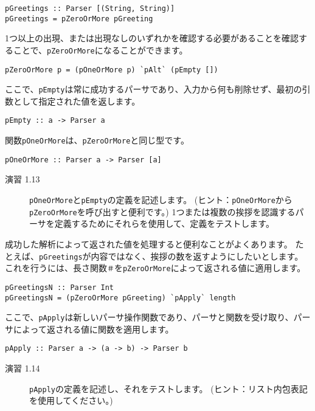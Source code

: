\documentclass{jarticle}
\begin{document}
\begin{verbatim}
pGreetings :: Parser [(String, String)]
pGreetings = pZeroOrMore pGreeting
\end{verbatim}

1つ以上の出現、または出現なしのいずれかを確認する必要があることを確認することで、\texttt{pZeroOrMore}になることができます。

\begin{verbatim}
pZeroOrMore p = (pOneOrMore p) `pAlt` (pEmpty [])
\end{verbatim}

ここで、\texttt{pEmpty}は常に成功するパーサであり、入力から何も削除せず、最初の引数として指定された値を返します。

\begin{verbatim}
pEmpty :: a -> Parser a
\end{verbatim}

関数\texttt{pOneOrMore}は、\texttt{pZeroOrMore}と同じ型です。

\begin{verbatim}
pOneOrMore :: Parser a -> Parser [a]
\end{verbatim}

\begin{description}
	\item[演習 1.13] \texttt{pOneOrMore}と\texttt{pEmpty}の定義を記述します。
		(ヒント：\texttt{pOneOrMore}から\texttt{pZeroOrMore}を呼び出すと便利です。)
		1つまたは複数の挨拶を認識するパーサを定義するためにそれらを使用して、定義をテストします。
\end{description}

成功した解析によって返された値を処理すると便利なことがよくあります。
たとえば、\texttt{pGreetings}が内容ではなく、挨拶の数を返すようにしたいとします。
これを行うには、長さ関数\texttt{＃}を\texttt{pZeroOrMore}によって返される値に適用します。

\begin{verbatim}
pGreetingsN :: Parser Int
pGreetingsN = (pZeroOrMore pGreeting) `pApply` length
\end{verbatim}

ここで、\texttt{pApply}は新しいパーサ操作関数であり、パーサと関数を受け取り、パーサによって返される値に関数を適用します。

\begin{verbatim}
pApply :: Parser a -> (a -> b) -> Parser b
\end{verbatim}

\begin{description}
	\item[演習 1.14] \texttt{pApply}の定義を記述し、それをテストします。
		(ヒント：リスト内包表記を使用してください。)
\end{description}
\end{document}
